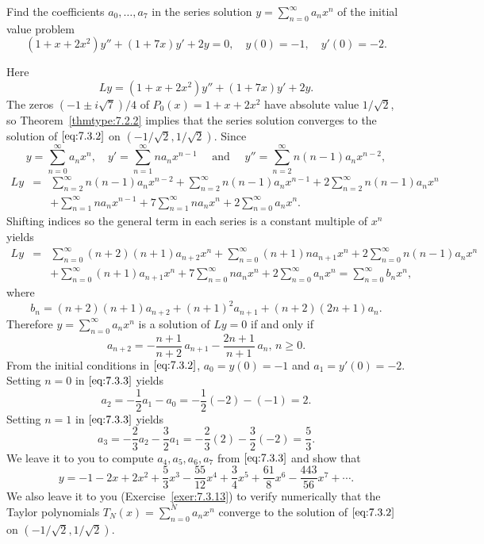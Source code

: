 \documentclass{ximera}
\begin{document}
\begin{example}\label{example:7.3.1}
Find the coefficients $a_0, \dots, a_7$ in the  series solution
$y=\sum^\infty_{n=0}
a_nx^n$  of the initial value problem
\begin{equation} \label{eq:7.3.2}
(1+x+2x^2)y''+(1+7x)y'+2y=0,\quad y(0)=-1,\quad y'(0)=-2.
\end{equation}


\begin{explanation}
Here
$$
Ly=(1+x+2x^2)y''+(1+7x)y'+2y.
$$
The zeros $(-1\pm i\sqrt7)/4$ of $P_0(x)=1+x+2x^2$ have absolute value
$1/\sqrt2$, so Theorem~\ref{thmtype:7.2.2} implies that the series
solution
converges to the solution of $\eqref{eq:7.3.2}$ on $(-1/\sqrt2,1/\sqrt2)$.
Since
$$
y=\sum^\infty_{n=0} a_nx^n,\quad y'=\sum^\infty_{n=1} n
a_nx^{n-1}\quad\mbox{ and }\quad  y''=\sum^\infty_{n=2}n(n-1)a_nx^{n-2},
$$
\begin{eqnarray*}
Ly&=&\sum^\infty_{n=2}n(n-1)a_nx^{n-2}+\sum^\infty_{n=2}n(n-1)a_nx^{n-1}
+2\sum^\infty_{n=2}n(n-1)a_nx^n\\
&&+\sum^\infty_{n=1}na_nx^{n-1}+7\sum^\infty_{n=1}na_nx^n+2\sum^\infty_{n=0}
a_nx^n.
\end{eqnarray*}
Shifting indices so  the general term in each
series is a constant multiple of $x^n$ yields
\begin{eqnarray*}
Ly&=&\sum^\infty_{n=0}(n+2)(n+1)a_{n+2}x^n+\sum^\infty_{n=0}(n+1)na_{n+1}x^n
+2\sum^\infty_{n=0}n(n-1)a_nx^n\\
&&+\sum^\infty_{n=0}(n+1)a_{n+1}x^n+7\sum^\infty_{n=0}na_nx^n+
2\sum^\infty_{n=0}a_nx^n
=\sum^\infty_{n=0}b_nx^n,
\end{eqnarray*}
where
$$
b_n=(n+2)(n+1)a_{n+2}+(n+1)^2a_{n+1}+(n+2)(2n+1)a_n.
$$
Therefore $y=\sum^\infty_{n=0}a_nx^n$ is a solution of $Ly=0$
if and only if
\begin{equation} \label{eq:7.3.3}
a_{n+2}=-\frac{n+1}{n+2}\,a_{n+1}-\frac{2n+1}{n+1}\,a_n,\,n\geq0.
\end{equation}
From the initial conditions in $\eqref{eq:7.3.2}$, $a_0=y(0)=-1$ and
$a_1=y'(0)=-2$.
Setting $n=0$  in $\eqref{eq:7.3.3}$ yields
$$
a_2=-\frac{1}{2}a_1-a_0=-\frac{1}{2}(-2)-(-1)=2.
$$
Setting $n=1$  in $\eqref{eq:7.3.3}$ yields
$$
a_3=-\frac{2}{3}a_2-\frac{3}{2}a_1=-\frac{2}{3}(2)-\frac{3}{2}(-2)=\frac{5}{3}.
$$
We leave it to you to compute $a_4,a_5,a_6,a_7$ from $\eqref{eq:7.3.3}$ and
show that
$$
y=-1-2x+2x^2+\frac{5}{3}x^3-\frac{55}{12}x^4+\frac{3}{4}x^5+\frac{61}{8}x^6-
\frac{443}{56}x^7+\cdots .
$$
We also leave it to you (Exercise~\ref{exer:7.3.13}) 
to verify numerically
that the Taylor polynomials $T_N(x)=\sum_{n=0}^Na_nx^n$ converge
to the solution of $\eqref{eq:7.3.2}$
on $(-1/\sqrt2,1/\sqrt2)$.
\end{explanation}
\end{example}
\end{document}
